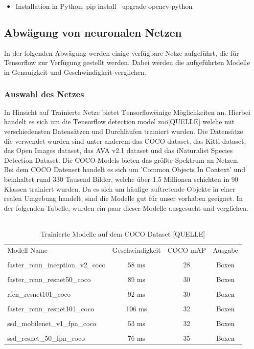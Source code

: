 \documentclass[a4paper,12pt,oneside]{article}
\begin{document}
  \begin{itemize}
\item Installation in Python: pip install --upgrade opencv-python
  \end{itemize}

  \subsection{Abwägung von neuronalen Netzen} 
In der folgenden Abwägung werden einige verfügbare Netze aufgeführt, die für Tensorflow zur Verfügung gestellt werden. Dabei werden die aufgeführten Modelle in Genauigkeit und Geschwindigkeit verglichen.
 
  \subsubsection{Auswahl des Netzes} 
In Hinsicht auf Trainierte Netze bietet \"Tensorflow\" einige Möglichkeiten an. Hierbei handelt es sich um die \"Tensorflow detection model zoo\"[QUELLE] welche mit verschiedensten Datensätzen und Durchläufen trainiert wurden. Die Datensätze die verwendet wurden sind unter anderem das COCO dataset, das Kitti dataset, das Open Images dataset, das AVA v2.1 dataset und das iNaturalist Species Detection Dataset. Die COCO-Models bieten das größte Spektrum an Netzen. Bei dem COCO Datenset handelt es sich um 'Common Objects In Context' und beinhaltet rund 330 Tausend Bilder, welche über 1.5 Millionen schichten in 90 Klassen trainiert wurden. Da es sich um häufige auftretende Objekte in einer realen Umgebung handelt, sind die Modelle gut für unser vorhaben geeignet. In der folgenden Tabelle, wurden ein paar dieser Modelle ausgesucht und verglichen.
\\
\\

\begin{table}
[h]
\begin{tabular}{|l|c|c|c|}
 
Modell Name & Geschwindigkeit & COCO mAP & Ausgabe\\
 & & & \\
faster\_rcnn\_inception\_v2\_coco & 58 ms & 28 & Boxen\\
 & & & \\
faster\_rcnn\_resnet50\_coco & 89 ms & 30 & Boxen\\
 & & & \\
rfcn\_resnet101\_coco & 92 ms & 30 & Boxen\\
 & & & \\
faster\_rcnn\_resnet101\_coco & 106 ms & 32 & Boxen\\
 & & & \\
ssd\_mobilenet\_v1\_fpn\_coco & 53 ms & 32 & Boxen\\
 & & & \\
ssd\_resnet\_50\_fpn\_coco & 76 ms & 35 & Boxen

\vspace{0.5 cm}
 
\end{tabular}
\caption{Trainierte Modelle auf dem COCO Dataset [QUELLE]}
\end{table}
\end{document}
